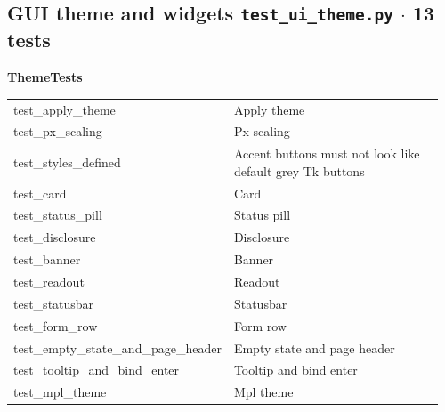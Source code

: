 \subsection{GUI theme and widgets \hfill \normalfont\small\color{soft2}\texttt{test\_ui\_theme.py} $\cdot$ 13 tests}
\par\smallskip \textbf{ThemeTests}\par\nopagebreak\smallskip
\begin{longtable}{@{}>{\ttfamily\scriptsize\raggedright\arraybackslash}p{0.40\linewidth} >{\footnotesize\raggedright\arraybackslash}p{0.555\linewidth}@{}}
test\_\allowbreak{}apply\_\allowbreak{}theme & Apply theme \\
test\_\allowbreak{}px\_\allowbreak{}scaling & Px scaling \\
test\_\allowbreak{}styles\_\allowbreak{}defined & Accent buttons must not look like default grey Tk buttons \\
test\_\allowbreak{}card & Card \\
test\_\allowbreak{}status\_\allowbreak{}pill & Status pill \\
test\_\allowbreak{}disclosure & Disclosure \\
test\_\allowbreak{}banner & Banner \\
test\_\allowbreak{}readout & Readout \\
test\_\allowbreak{}statusbar & Statusbar \\
test\_\allowbreak{}form\_\allowbreak{}row & Form row \\
test\_\allowbreak{}empty\_\allowbreak{}state\_\allowbreak{}and\_\allowbreak{}page\_\allowbreak{}header & Empty state and page header \\
test\_\allowbreak{}tooltip\_\allowbreak{}and\_\allowbreak{}bind\_\allowbreak{}enter & Tooltip and bind enter \\
test\_\allowbreak{}mpl\_\allowbreak{}theme & Mpl theme \\
\end{longtable}
